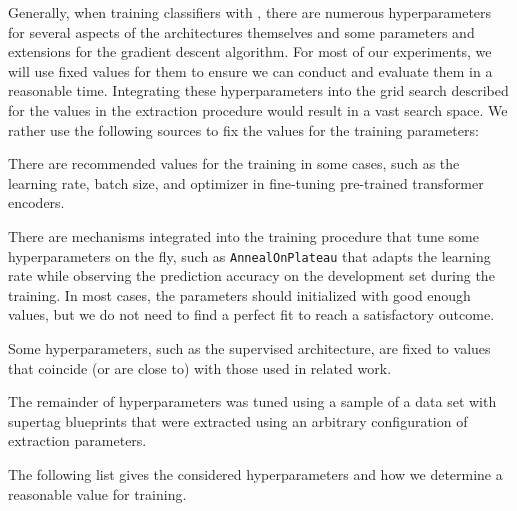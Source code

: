 \documentclass[../../document.tex]{subfiles}
\begin{document}
    Generally, when training classifiers with , there are numerous hyperparameters for several aspects of the architectures themselves and some parameters and extensions for the gradient descent algorithm.
    For most of our experiments, we will use fixed values for them to ensure we can conduct and evaluate them in a reasonable time.
    Integrating these hyperparameters into the grid search described for the values in the extraction procedure would result in a vast search space.
    We rather use the following sources to fix the values for the training parameters:
    \begin{compactitem}
        \item There are recommended values for the training in some cases, such as the learning rate, batch size, and optimizer in fine-tuning pre-trained transformer encoders. \citep{Devlin2019}
        \item There are mechanisms integrated into the training procedure that tune some hyperparameters on the fly, such as \texttt{AnnealOnPlateau} that adapts the learning rate while observing the prediction accuracy on the development set during the training. In most cases, the parameters should initialized with good enough values, but we do not need to find a perfect fit to reach a satisfactory outcome.
        \item Some hyperparameters, such as the supervised architecture, are fixed to values that coincide (or are close to) with those used in related work.
        \item The remainder of hyperparameters was tuned using a sample of a data set with supertag blueprints that were extracted using an arbitrary configuration of extraction parameters.
    \end{compactitem}
    The following list gives the considered hyperparameters and how we determine a reasonable value for training.
\end{document}

